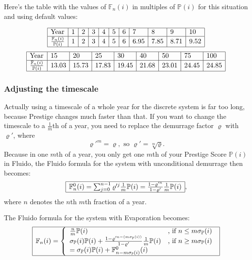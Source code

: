 \documentclass[a4paper,12pt]{scrartcl}
\newcounter{formula}
\begin{document}
Here's the table with the values of $\mathbb{F}_n(i)$ in multiples of $\mathbb{P}(i)$ for this situation and using default values:

\[
\begin{array}{|l|l|l|l|l|l|l|l|l|l|l|l|l|l|l|}
\hline
\mbox{Year} & 1 & 2 & 3 & 4 & 5 & 6 & 7 & 8 & 9 & 10\\
\hline
\frac{\mathbb{F}_n(i)}{\mathbb{P}(i)} & 1 & 2 & 3 & 4 & 5 & 6 & 6.95 & 7.85 & 8.71 & 9.52 \\
\hline
\end{array}
\]
\[
\begin{array}{|l|l|l|l|l|l|l|l|l|l|l|l|l|l|l|}
\hline
\mbox{Year} & 15 & 20 & 25 & 30 & 40 & 50 & 75 & 100\\
\hline
\frac{\mathbb{F}_n(i)}{\mathbb{P}(i)} & 13.03 & 15.73 & 17.83 & 19.45 & 21.68 & 23.01 & 24.45 & 24.85 \\
\hline
\end{array}
\]

\subsubsection{Adjusting the timescale}
Actually using a timescale of a whole year for the discrete system is far too long, because Prestige changes much faster than that. If you want to change the timescale to a $\frac{1}{m}$th of a year, you need to replace the demurrage factor $\varrho$ with $\varrho'$, where
$$\varrho'^m=\varrho, \mbox{ so } \varrho'= \sqrt[m]{\varrho}.$$
Because in one $m$th of a year, you only get one $m$th of your Prestige Score $\mathbb{P}(i)$ in Fluido, the Fluido formula for the system with unconditional demurrage then becomes:
$$
\begin{array}{|l|}
\hline
\mathbb{F}^0_n(i) = \sum_{j=0}^{n-1}\varrho'^j \frac{1}{m} \mathbb{P}(i) = \frac{1-\varrho'^n}{1-\varrho'} \frac{1}{m} \mathbb{P}(i)\\
\hline
\end{array},$$
where $n$ denotes the $n$th $m$th fraction of a year.

The Fluido formula for the system with Evaporation becomes:
$$
\begin{array}{|l|}
\hline
\mathbb{F}_n(i) = \left\{
\begin{array}{ll}
\frac{n}{m} \mathbb{P}(i) & \mbox{, if } n \leq m \sigma_{\mathbb{P}}(i) \\
\sigma_{\mathbb{P}}(i) \mathbb{P}(i) + \frac{1-\varrho'^{n-(m\sigma_{\mathbb{P}}(i))}}{1-\varrho'} \frac{1}{m} \mathbb{P}(i) & \mbox{, if } n \geq m \sigma_{\mathbb{P}}(i)\\
= \sigma_{\mathbb{P}}(i) \mathbb{P}(i) + \mathbb{F}^0_{n-m\sigma_{\mathbb{P}}(i)}(i) &
\end{array}\right.\\
\hline
\end{array}
$$
\end{document}
